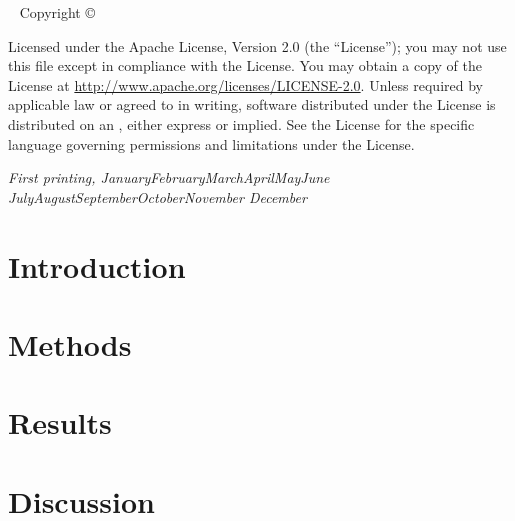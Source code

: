 \documentclass[a4paper,sfsidenotes,twoside]{tufte-book}
\title[Proliferation and Differentiation in cancer]{%
  \setlength{\parindent}{0pt}%
  Proliferation and \par
  Differentiation \par
  in Cancer
  \vspace{1cm}
}
\author[Gil Tomás]{Gil Tomás}
\newcommand{\monthyear}{%
  \ifcase\month\or January\or February\or March\or April\or May\or June\or
  July\or August\or September\or October\or November\or
  December\fi\space\number\year
}
\newcommand{\blankpage}{\newpage\hbox{}\thispagestyle{empty}\newpage}
\begin{document}
\frontmatter

\blankpage


\newpage
\begin{fullwidth}
~\vfill
\thispagestyle{empty}
\setlength{\parindent}{0pt}
\setlength{\parskip}{\baselineskip}
Copyright \copyright\ \the\year\ \thanklessauthor

\par{}

\par{}

\par Licensed under the Apache License, Version 2.0 (the ``License''); you may
not use this file except in compliance with the License. You may obtain a copy
of the License at \url{http://www.apache.org/licenses/LICENSE-2.0}. Unless
required by applicable law or agreed to in writing, software distributed under
the License is distributed on an , either express or implied. See the License for the
specific language governing permissions and limitations under the
License.

\par\textit{First printing, \monthyear}
\end{fullwidth}


\tableofcontents
\listoffigures
\listoftables


\chapter{Introduction}
\label{chap:introduction}







\chapter{Methods}
\label{chap:methods}




\chapter{Results}
\label{chap:results}




\chapter{Discussion}
\label{chap:discussion}






\backmatter



\end{document}
